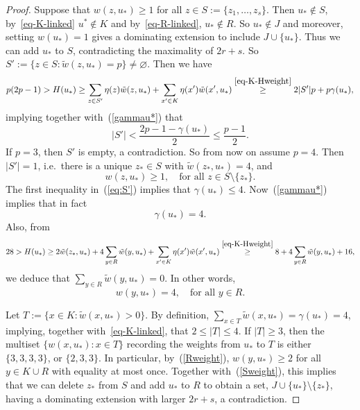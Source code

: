 \documentclass[10pt,a4paper]{amsart}
\begin{document}
\begin{proof}
	Suppose that $w(z,u_*) \geq 1$ for all $z \in S := \lbrace z_1,\ldots,z_s\rbrace$. Then $u_* \notin S$, by~\eqref{eq-K-linked} $u^* \notin K$ and by~\eqref{eq-R-linked}, $u_* \notin R$.
	So $u_* \notin J$ and moreover, setting $w(u_*)=1$ gives a dominating extension to include $J \cup \{u_*\}$.
	Thus we can add $u_*$ to $S$, contradicting the maximality of $2r+s$.
	So $S' := \{z \in S: \tilde{w}(z,u_*)=p\} \neq \varnothing$.
	Then  we have
	$$p(2p-1)>H(u_*)\ge \sum_{z \in S'}\eta(z)\tilde{w}(z,u_*)+\sum_{x' \in K}\eta(x')\tilde{w}(x',u_*)\stackrel{\eqref{eq-K-Hweight}}{\ge} 2|S'|p+p\gamma(u_*), $$
	implying together with~(\ref{gammau*}) that
	\begin{equation}\label{eq:S'}
		|S'|<\frac{2p-1-\gamma(u_*)}{2} \le \frac{p-1}{2}.
	\end{equation}
	If $p=3$, then $S'$ is empty, a contradiction.
	So from now on assume $p=4$.
	Then $|S'|=1$, i.e.~there is a unique $z_* \in S$ with $\tilde{w}(z_*,u_*)=4$, and 
	\begin{equation}\label{Sweight}
		w(z,u_*)\geq 1,\quad\text{for all }z \in S\setminus\lbrace z_*\rbrace.
	\end{equation}
	The first inequality in~(\ref{eq:S'}) implies that $\gamma(u_*) \leq 4$.
	Now~(\ref{gammau*}) implies that in fact $$\gamma(u_*)=4.$$
	Also, from
	$$
	28 > H(u_*) \geq 2\tilde{w}(z_*,u_*)+ 4\sum_{y \in R}\tilde{w}(y,u_*) +\sum_{x' \in K}\eta(x')\tilde{w}(x',u_*)\stackrel{\eqref{eq-K-Hweight}}{\ge} 8+4\sum_{y \in R}\tilde{w}(y,u_*)+16,
	$$
	we deduce that $\sum_{y \in R}\tilde{w}(y,u_*)=0$. In other words,
	\begin{equation}\label{Rweight}
		w(y,u_*) =4, \quad\text{for all }y \in R.
	\end{equation}
	
	Let $T := \lbrace x \in K: \tilde{w}(x,u_*) > 0\rbrace$. By definition, $ \sum_{x \in T}\tilde{w}(x,u_*)=\gamma(u_*) =4$, implying, together with~\eqref{eq-K-linked}, that $2 \leq |T| \leq 4$.
	If $|T| \geq 3$, then the multiset $\lbrace w(x,u_*) : x \in T\rbrace$ recording the weights from $u_*$ to $T$ is either $ \lbrace 3,3,3,3\rbrace$, or  $\lbrace 2,3,3\rbrace$. In particular, by~(\ref{Rweight}), $w(y,u_*) \geq 2$ for all $y \in K \cup R$ with equality at most once.
	Together with~(\ref{Sweight}), this implies that
	we can delete $z_*$ from $S$ and add $u_*$ to $R$ to obtain a set, $J\cup\{u_*\}\setminus\{z_*\}$, having a dominating extension with larger $2r+s$, a contradiction.
	

\end{proof}
\end{document}
